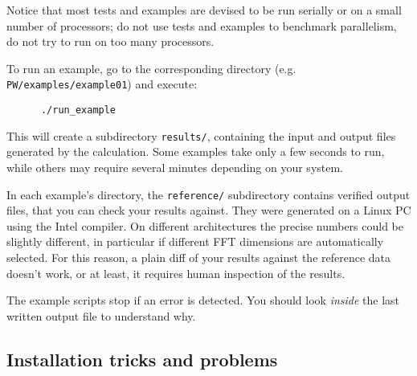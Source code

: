 \documentclass[12pt,a4paper]{article}
\begin{document}
Notice that most tests and examples are devised to be run serially 
or on a small number of processors; do not use tests and examples
to benchmark parallelism, do not try to run on too many processors.

To run an example, go to the corresponding directory (e.g.
 \texttt{PW/examples/example01}) and execute: 
\begin{verbatim}
      ./run_example
\end{verbatim}
This will create a subdirectory \texttt{results/}, containing the input and
output files generated by the calculation. Some examples take only a
few seconds to run, while others may require several minutes depending
on your system.

In each example's directory, the \texttt{reference/} subdirectory contains
verified output files, that you can check your results against. They
were generated on a Linux PC using the Intel compiler. On different
architectures the precise numbers could be slightly different, in
particular if different FFT dimensions are automatically selected. For
this reason, a plain diff of your results against the reference data
doesn't work, or at least, it requires human inspection of the results. 

The example scripts stop if an error is detected. You should look {\em inside}
the last written output file to understand why.

\subsection{Installation tricks and problems}
\end{document}

